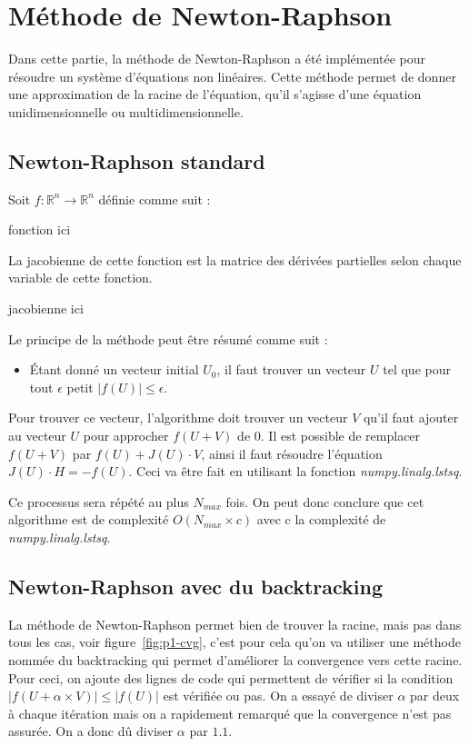 \section{Méthode de Newton-Raphson}
Dans cette partie, la méthode de Newton-Raphson a été implémentée pour résoudre un système d'équations non linéaires. Cette méthode permet de donner une approximation de la racine de l'équation, qu'il s'agisse d'une équation unidimensionnelle ou multidimensionnelle.

\subsection{Newton-Raphson standard}
Soit $f : \mathbb{R}^n \to \mathbb{R}^n$ définie comme suit :


fonction ici


La jacobienne de cette fonction est la matrice des dérivées partielles selon chaque variable de cette fonction.


jacobienne ici


Le principe de la méthode peut être résumé comme suit :
\begin{itemize}
\item Étant donné un vecteur initial $U_0$, il faut trouver un vecteur $U$ tel que pour tout $\epsilon$ petit $ |f(U)| \le \epsilon $.
\end{itemize}

Pour trouver ce vecteur, l'algorithme doit trouver un vecteur $V$ qu'il faut ajouter au vecteur $U$
pour approcher $f(U+V)$ de $0$.
Il est possible de remplacer $f(U+V)$ par $f(U) + J(U) \cdot V$, ainsi il faut résoudre l'équation $J(U) \cdot H = -f(U)$.
Ceci va être fait en utilisant la fonction \emph{numpy.linalg.lstsq}.

Ce processus sera répété au plus $N_{max}$ fois.
On peut donc conclure que cet algorithme est de complexité $O(N_{max} \times c)$ avec c la complexité de \emph{numpy.linalg.lstsq}.

\subsection{Newton-Raphson avec du backtracking}
La méthode de Newton-Raphson permet bien de trouver la racine, mais pas dans tous les cas, voir figure~\ref{fig:p1-cvg},
c'est pour cela qu'on va utiliser une méthode nommée du backtracking qui permet d'améliorer la
convergence vers cette racine.
Pour ceci, on ajoute des lignes de code qui permettent de vérifier si la condition
$|f(U + \alpha \times V)|\le|f(U)|$ est vérifiée ou pas. On a essayé de diviser $\alpha$ par deux à chaque
itération mais on a rapidement remarqué que la convergence n'est pas assurée. On a donc dû diviser
$\alpha$ par $1.1$.


